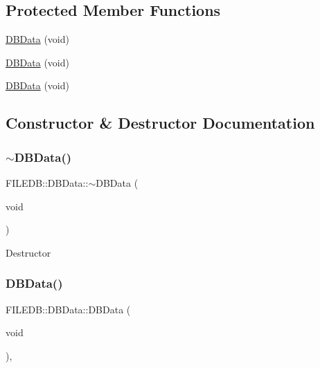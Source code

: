 \subsection*{Protected Member Functions}
\begin{DoxyCompactItemize}
\item 
\mbox{\hyperlink{classFILEDB_1_1DBData_a81662e20dfe472b9c56ec1e9ff8278fc}{D\+B\+Data}} (void)
\item 
\mbox{\hyperlink{classFILEDB_1_1DBData_a81662e20dfe472b9c56ec1e9ff8278fc}{D\+B\+Data}} (void)
\item 
\mbox{\hyperlink{classFILEDB_1_1DBData_a81662e20dfe472b9c56ec1e9ff8278fc}{D\+B\+Data}} (void)
\end{DoxyCompactItemize}


\subsection{Constructor \& Destructor Documentation}
\mbox{\label{classFILEDB_1_1DBData_afb154d074a887601e48853bb5b7089b5}} 
\subsubsection{\texorpdfstring{$\sim$DBData()}{~DBData()}\hspace{0.1cm}{\footnotesize\ttfamily [1/3]}}
{\footnotesize\ttfamily F\+I\+L\+E\+D\+B\+::\+D\+B\+Data\+::$\sim$\+D\+B\+Data (\begin{DoxyParamCaption}\item[{void}]{ }\end{DoxyParamCaption})\hspace{0.3cm}{\ttfamily [inline]}}

Destructor \mbox{\label{classFILEDB_1_1DBData_a81662e20dfe472b9c56ec1e9ff8278fc}} 
\subsubsection{\texorpdfstring{DBData()}{DBData()}\hspace{0.1cm}{\footnotesize\ttfamily [1/3]}}
{\footnotesize\ttfamily F\+I\+L\+E\+D\+B\+::\+D\+B\+Data\+::\+D\+B\+Data (\begin{DoxyParamCaption}\item[{void}]{ }\end{DoxyParamCaption})\hspace{0.3cm}{\ttfamily [inline]}, {\ttfamily [protected]}}

